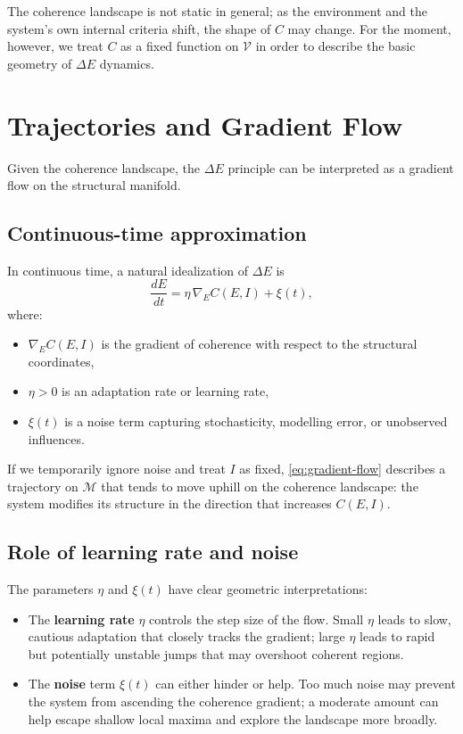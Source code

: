 \documentclass[12pt,a4paper]{report}
\begin{document}
The coherence landscape is not static in general; as the environment and the system's own internal criteria shift, the shape of \(C\) may change. For the moment, however, we treat \(C\) as a fixed function on \(\mathcal{V}\) in order to describe the basic geometry of $\Delta E$ dynamics.

\section{Trajectories and Gradient Flow}

Given the coherence landscape, the $\Delta E$ principle can be interpreted as a gradient flow on the structural manifold.

\subsection*{Continuous-time approximation}

In continuous time, a natural idealization of $\Delta E$ is
\begin{equation}
    \frac{dE}{dt} = \eta \, \nabla_E C(E, I) + \xi(t),
    \label{eq:gradient-flow}
\end{equation}
where:

\begin{itemize}[leftmargin=2em]
    \item \(\nabla_E C(E, I)\) is the gradient of coherence with respect to the structural coordinates,
    \item \(\eta > 0\) is an adaptation rate or learning rate,
    \item \(\xi(t)\) is a noise term capturing stochasticity, modelling error, or unobserved influences.
\end{itemize}

If we temporarily ignore noise and treat \(I\) as fixed, \eqref{eq:gradient-flow} describes a trajectory on \(\mathcal{M}\) that tends to move uphill on the coherence landscape: the system modifies its structure in the direction that increases \(C(E, I)\).

\subsection*{Role of learning rate and noise}

The parameters \(\eta\) and \(\xi(t)\) have clear geometric interpretations:

\begin{itemize}[leftmargin=2em]
    \item The \textbf{learning rate} \(\eta\) controls the step size of the flow. Small \(\eta\) leads to slow, cautious adaptation that closely tracks the gradient; large \(\eta\) leads to rapid but potentially unstable jumps that may overshoot coherent regions.
    \item The \textbf{noise} term \(\xi(t)\) can either hinder or help. Too much noise may prevent the system from ascending the coherence gradient; a moderate amount can help escape shallow local maxima and explore the landscape more broadly.
\end{itemize}
\end{document}
